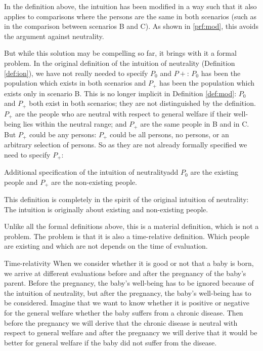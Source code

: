 In the definition above, the intuition has been modified in a way such that it also applies to comparisons where the persons are the same in both scenarios (such as in the comparison between scenarios B and C). As shown in \ref{prf:mod}, this avoids the argument against neutrality. 

But while this solution may be compelling so far, it brings with it a formal problem. In the original definition of the intuition of neutrality (Definition \ref{def:ion}), we have not really needed to specify $P_0$ and $P+$: $P_0$ has been the population which exists in both scenarios and $P_+$ has been the population which exists only in scenario B. This is no longer implicit in Definition \ref{def:mod}: $P_0$ and $P_+$ both exist in both scenarios; they are not distinguished by the definition. $P_+$ are the people who are neutral with respect to general welfare if their well-being lies within the neutral range; and $P_+$ are the same people in B and in C. But $P_+$ could be any persons: $P_+$ could be all persons, no persons, or an arbitrary selection of persons. So as they are not already formally specified we need to specify $P_+$:

\begin{Definition}{Additional specification of the intuition of neutrality}{add}
$P_0$ are the existing people and $P_+$ are the non-existing people.
\end{Definition}

This definition is completely in the spirit of the original intuition of neutrality: The intuition is originally about existing and non-existing people. 

Unlike all the formal definitions above, this is a material definition, which is not a problem. The problem is that it is also a time-relative definition. Which people are existing and which are not depends on the time of evaluation. 

\begin{Example}{Time-relativity}{}
When we consider whether it is good or not that a baby is born, we arrive at different evaluations before and after the pregnancy of the baby's parent. Before the pregnancy, the baby's well-being has to be ignored because of the intuition of neutrality, but after the pregnancy, the baby's well-being has to be considered. Imagine that we want to know whether it is positive or negative for the general welfare whether the baby suffers from a chronic disease. Then before the pregnancy we will derive that the chronic disease is neutral with respect to general welfare and after the pregnancy we will derive that it would be better for general welfare if the baby did not suffer from the disease. 
\end{Example}

